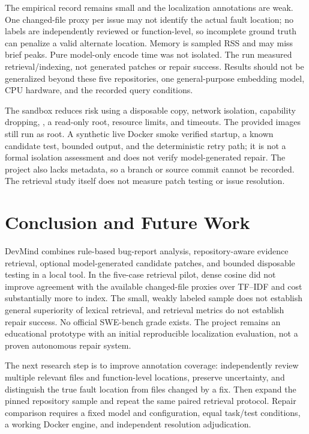 \documentclass[3p,times,procedia]{elsarticle}
\begin{document}
The empirical record remains small and the localization annotations are weak. One changed-file proxy per issue may not identify the actual fault location; no labels are independently reviewed or function-level, so incomplete ground truth can penalize a valid alternate location. Memory is sampled RSS and may miss brief peaks. Pure model-only encode time was not isolated. The run measured retrieval/indexing, not generated patches or repair success. Results should not be generalized beyond these five repositories, one general-purpose embedding model, CPU hardware, and the recorded query conditions.

The sandbox reduces risk using a disposable copy, network isolation, capability dropping, \texttt{}, a read-only root, resource limits, and timeouts. The provided images still run as root. A synthetic live Docker smoke verified startup, a known candidate test, bounded output, and the deterministic retry path; it is not a formal isolation assessment and does not verify model-generated repair. The project also lacks \texttt{} metadata, so a branch or source commit cannot be recorded. The retrieval study itself does not measure patch testing or issue resolution.

\section{Conclusion and Future Work}
DevMind combines rule-based bug-report analysis, repository-aware evidence retrieval, optional model-generated candidate patches, and bounded disposable testing in a local tool. In the five-case retrieval pilot, dense cosine did not improve agreement with the available changed-file proxies over TF--IDF and cost substantially more to index. The small, weakly labeled sample does not establish general superiority of lexical retrieval, and retrieval metrics do not establish repair success. No official SWE-bench grade exists. The project remains an educational prototype with an initial reproducible localization evaluation, not a proven autonomous repair system.

The next research step is to improve annotation coverage: independently review multiple relevant files and function-level locations, preserve uncertainty, and distinguish the true fault location from files changed by a fix. Then expand the pinned repository sample and repeat the same paired retrieval protocol. Repair comparison requires a fixed model and configuration, equal task/test conditions, a working Docker engine, and independent resolution adjudication.
\end{document}
